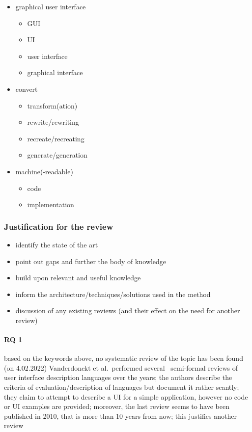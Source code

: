 \begin{itemize}
    \item graphical user interface 
    \begin{itemize}
        \item GUI
        \item UI
        \item user interface
        \item graphical interface
    \end{itemize}
    \item convert
    \begin{itemize}
        \item transform(ation)
        \item rewrite/rewriting
        \item recreate/recreating
        \item generate/generation
    \end{itemize}
    \item machine(-readable)
    \begin{itemize}
        \item code
        \item implementation
    \end{itemize}
\end{itemize}

\subsubsection[Justification]{Justification for the review}
\begin{itemize}
    \item identify the state of the art
    \item point out gaps and further the body of knowledge
    \item build upon relevant and useful knowledge
    \item inform the architecture/techniques/solutions used in the method
    \item discussion of any existing reviews (and their effect on the need for another review)
\end{itemize}

\paragraph{RQ 1}
based on the keywords above, no systematic review of the topic has been found (on 4.02.2022)
Vanderdonckt et al.\ performed several~\cite{souchon_review_2003,guerrero_garcia_theoretical_2009,guerrero_garcia_theoretical_2011} semi-formal reviews of
user interface description languages over the years;
the authors describe the criteria of evaluation/description of languages but document it rather scantly;
they claim to attempt to describe a UI for a simple application, however no code or UI examples are provided;
moreover, the last review seems to have been published in 2010, that is more than 10 years from now;
this justifies another review


